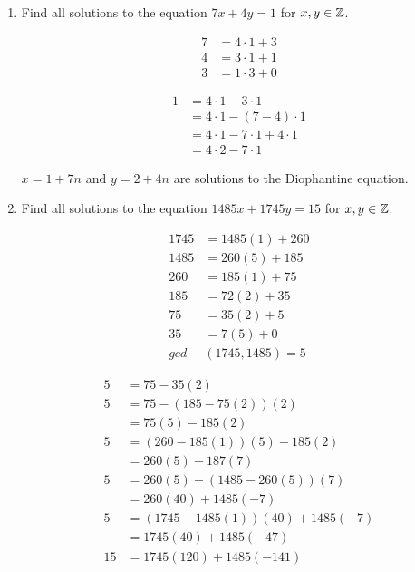 \documentclass{hw}
\begin{document}
\begin{enumerate}
\item Find all solutions to the equation $7x+4y=1$ for $x,y\in\mathbb{Z}$.
\begin{center}
\begin{minipage}[t]{0.4\textwidth}
\begin{align*}
7 &= 4\cdot1 + 3\\
4 &= 3\cdot1 + 1\\
3 &= 1\cdot3 + 0
\end{align*}
\end{minipage}
\begin{minipage}[t]{0.4\textwidth}
\begin{align*}
1 &= 4\cdot1 - 3\cdot1\\
&= 4\cdot1 - (7-4)\cdot1\\
&= 4\cdot1 -7\cdot1 + 4\cdot1\\
&= 4\cdot2-7\cdot1
\end{align*}
\end{minipage}
\end{center}
$x = 1+7n$ and $y=2+4n$ are solutions to the Diophantine equation.

\item Find all solutions to the equation $1485x + 1745y = 15$ for $x,y\in\mathbb{Z}$.
\begin{center}
\begin{minipage}[t]{0.4\textwidth}
\begin{align*}
1745 &= 1485(1) + 260\\
1485 &= 260(5) + 185\\
260 &= 185(1) + 75\\
185 &= 72(2) + 35\\
75 &= 35(2) + 5\\
35 &= 7(5) + 0\\
gcd&(1745,1485) = 5
\end{align*}
\end{minipage}
\begin{minipage}[t]{0.4\textwidth}
\begin{align*}
5 &= 75 - 35(2)\\
5 &= 75 - (185 - 75(2))(2)\\
&= 75(5) - 185(2)\\
5 &= (260-185(1))(5)-185(2)\\
&= 260(5)-187(7)\\
5 &= 260(5) - (1485 -260(5))(7)\\
&= 260(40) + 1485(-7)\\
5 &= (1745 - 1485(1))(40) + 1485(-7)\\
&= 1745(40) + 1485(-47)\\
15 &= 1745(120) + 1485(-141)
\end{align*}
\end{minipage}
\end{center}


\end{enumerate}
\end{document}
